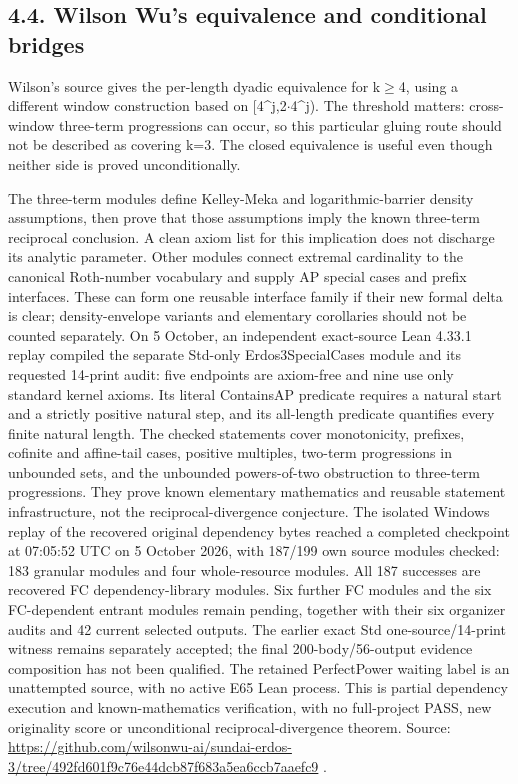 \documentclass[11pt,a4paper]{article}
\begin{document}
\subsection{4.4. Wilson Wu's equivalence and conditional bridges}
Wilson's source gives the per-length dyadic equivalence for k\ensuremath{\geq}4, using a different window construction based on [4\textasciicircum{}j,2\ensuremath{\cdot}4\textasciicircum{}j). The threshold matters: cross-window three-term progressions can occur, so this particular gluing route should not be described as covering k=3. The closed equivalence is useful even though neither side is proved unconditionally.

The three-term modules define Kelley-Meka and logarithmic-barrier density assumptions, then prove that those assumptions imply the known three-term reciprocal conclusion. A clean axiom list for this implication does not discharge its analytic parameter. Other modules connect extremal cardinality to the canonical Roth-number vocabulary and supply AP special cases and prefix interfaces. These can form one reusable interface family if their new formal delta is clear; density-envelope variants and elementary corollaries should not be counted separately. On 5 October, an independent exact-source Lean 4.33.1 replay compiled the separate Std-only Erdos3SpecialCases module and its requested 14-print audit: five endpoints are axiom-free and nine use only standard kernel axioms. Its literal ContainsAP predicate requires a natural start and a strictly positive natural step, and its all-length predicate quantifies every finite natural length. The checked statements cover monotonicity, prefixes, cofinite and affine-tail cases, positive multiples, two-term progressions in unbounded sets, and the unbounded powers-of-two obstruction to three-term progressions. They prove known elementary mathematics and reusable statement infrastructure, not the reciprocal-divergence conjecture. The isolated Windows replay of the recovered original dependency bytes reached a completed checkpoint at 07:05:52 UTC on 5 October 2026, with 187/199 own source modules checked: 183 granular modules and four whole-resource modules. All 187 successes are recovered FC dependency-library modules. Six further FC modules and the six FC-dependent entrant modules remain pending, together with their six organizer audits and 42 current selected outputs. The earlier exact Std one-source/14-print witness remains separately accepted; the final 200-body/56-output evidence composition has not been qualified. The retained PerfectPower waiting label is an unattempted source, with no active E65 Lean process. This is partial dependency execution and known-mathematics verification, with no full-project PASS, new originality score or unconditional reciprocal-divergence theorem. Source: \url{https://github.com/wilsonwu-ai/sundai-erdos-3/tree/492fd601f9c76e44dcb87f683a5ea6ccb7aaefc9} .
\end{document}

